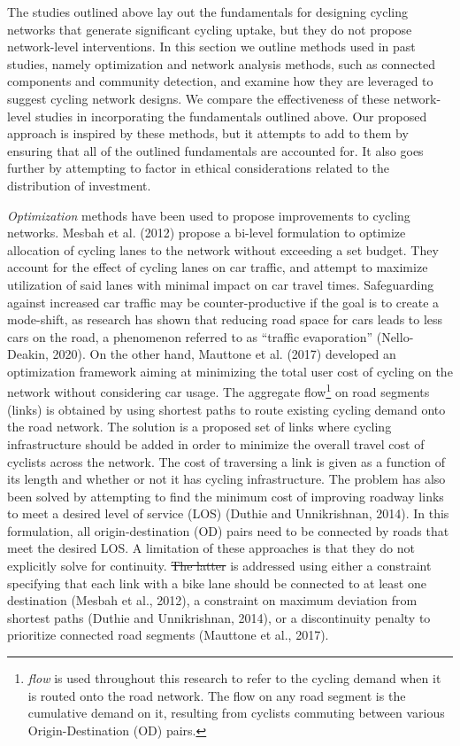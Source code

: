 \documentclass[
]{article}
\providecommand{\DIFaddtex}[1]{{\protect\color{blue}\uwave{#1}}} %
\providecommand{\DIFdeltex}[1]{{\protect\color{red}\sout{#1}}}                      %
\providecommand{\DIFaddbegin}{} %
\providecommand{\DIFaddend}{} %
\providecommand{\DIFdelbegin}{} %
\providecommand{\DIFdelend}{} %
\providecommand{\DIFadd}[1]{\texorpdfstring{\DIFaddtex{#1}}{#1}} %
\providecommand{\DIFdel}[1]{\texorpdfstring{\DIFdeltex{#1}}{}} %
\newcommand{\DIFscaledelfig}{0.5}
\newlength{\DIFdelgraphicswidth} %
\newlength{\DIFdelgraphicsheight} %
\newcommand{\DIFaddincludegraphics}[2][]{{\color{blue}\fbox{\DIFOincludegraphics[#1]{#2}}}} %
\newcommand{\DIFdelincludegraphics}[2][]{%
\sbox{\DIFdelgraphicsbox}{\DIFOincludegraphics[#1]{#2}}%
\settoboxwidth{\DIFdelgraphicswidth}{\DIFdelgraphicsbox} %
\settoboxtotalheight{\DIFdelgraphicsheight}{\DIFdelgraphicsbox} %
\scalebox{\DIFscaledelfig}{%
\parbox[b]{\DIFdelgraphicswidth}{\usebox{\DIFdelgraphicsbox}\\[-\baselineskip] \rule{\DIFdelgraphicswidth}{0em}}\llap{\resizebox{\DIFdelgraphicswidth}{\DIFdelgraphicsheight}{%
\setlength{\unitlength}{\DIFdelgraphicswidth}%
\begin{picture}(1,1)%
\thicklines\linethickness{2pt} %
{\color[rgb]{1,0,0}\put(0,0){\framebox(1,1){}}}%
{\color[rgb]{1,0,0}\put(0,0){\line( 1,1){1}}}%
{\color[rgb]{1,0,0}\put(0,1){\line(1,-1){1}}}%
\end{picture}%
}\hspace*{3pt}}} %
} %
\DeclareRobustCommand{\DIFaddbegin}{\DIFOaddbegin \let\includegraphics\DIFaddincludegraphics} %
\DeclareRobustCommand{\DIFaddend}{\DIFOaddend \let\includegraphics\DIFOincludegraphics} %
\DeclareRobustCommand{\DIFdelbegin}{\DIFOdelbegin \let\includegraphics\DIFdelincludegraphics} %
\DeclareRobustCommand{\DIFdelend}{\DIFOaddend \let\includegraphics\DIFOincludegraphics} %
\begin{document}
The studies outlined above lay out the fundamentals for designing
cycling networks that generate significant cycling uptake, but they do
not propose network-level interventions. In this section we outline
methods used in past studies, namely optimization and network
analysis methods, such as connected components and community
detection, and examine how they are leveraged to suggest cycling network
designs. We compare the effectiveness of these network-level studies in
incorporating the fundamentals outlined above.
Our proposed approach is inspired by these methods, but it attempts to add to them
by ensuring that all of the outlined fundamentals are accounted for. It
also goes further by attempting to factor in ethical considerations
related to the distribution of investment.

\emph{Optimization} methods have been used to propose improvements to
cycling networks. Mesbah et al. (2012) propose a bi-level formulation to
optimize allocation of cycling lanes to the network without exceeding a
set budget. They account for the effect of cycling lanes on car traffic,
and attempt to maximize utilization of said lanes with minimal impact on
car travel times. Safeguarding against increased car traffic may be counter-productive if the goal is to create a mode-shift, as research has shown that reducing road space for cars leads to less cars on the road, a phenomenon referred to as ``traffic evaporation'' (Nello-Deakin, 2020).
On the other hand, Mauttone et al. (2017) developed an optimization framework aiming at minimizing the total
user cost of cycling on the network without considering car usage. The aggregate flow\footnote{\emph{flow} is
  used throughout this research to refer to the cycling demand when it is
  routed onto the road network. The flow on any road segment is the
  cumulative demand on it, resulting from cyclists commuting between
  various Origin-Destination (OD) pairs.} on road segments (links) is obtained by using
shortest paths to route existing cycling demand onto the road network. The solution is a proposed set of links where cycling infrastructure
should be added in order to minimize the overall travel cost of cyclists
across the network. The cost of traversing a link is given as a function
of its length and whether or not it has cycling infrastructure. The
problem has also been solved by attempting to find the minimum cost of
improving roadway links to meet a desired level of service (LOS)
(Duthie and Unnikrishnan, 2014). In this formulation, all origin-destination
(OD) pairs need to be connected by roads that meet the desired LOS. A
limitation of these approaches is that they do not explicitly solve for
continuity. \DIFdelbegin \DIFdel{The latter }\DIFdelend \DIFaddbegin \DIFadd{Continuity }\DIFaddend is addressed using either a constraint specifying
that each link with a bike lane should be connected to at least one
destination (Mesbah et al., 2012), a constraint on maximum deviation
from shortest paths (Duthie and Unnikrishnan, 2014), or a discontinuity
penalty to prioritize connected road segments (Mauttone et al., 2017).
\end{document}
